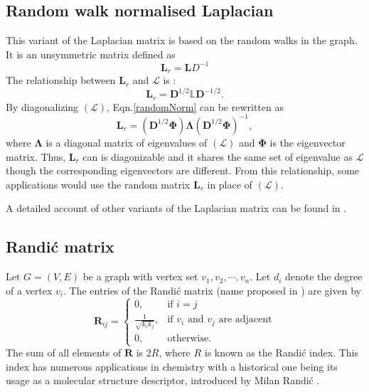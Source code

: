 \documentclass[10pt,a4paper]{article}
\theoremstyle{plain}
\theoremstyle{definition}
\begin{document}
\subsection{Random walk normalised Laplacian}
This variant of the Laplacian matrix is based on the random walks in the graph. It is an unsymmetric matrix defined as 
\begin{equation}
\mathbf{L}_r = \mathbf{L} D^{-1}
\end{equation}
The relationship between $\mathbf{L}_r$ and $\mathcal{L}$ is :
\begin{equation}
\mathbf{L}_r = \mathbf{D}^{1/2} \mathbb{L} \mathbf{D}^{-1/2}.
\label{randomNorm}
\end{equation}
By diagonalizing $\mathcal{(L)}$, Eqn.\ref{randomNorm} can be rewritten as 
\begin{equation}
\mathbf{L}_r = (\mathbf{D}^{1/2} \mathbf{\Phi}) \mathbf{\Lambda} (\mathbf{D}^{1/2} \mathbf{\Phi})^{-1},
\label{decomprandom}
\end{equation}
where $\mathbf{\Lambda}$ is a diagonal matrix of eigenvalues of $\mathcal{(L)}$ and $\mathbf{\Phi}$ is the eigenvector matrix. Thus, $\mathbf{L}_r$ can is diagonizable and it shares the same set of eigenvalue as $\mathcal{L}$ though the corresponding eigenvectors are different. From this relationship, some applications would use the random matrix $\mathbf{L}_r$ in place of $\mathcal{(L)}$.

A detailed account of other variants of the Laplacian matrix can be found in \citep{tsiatas2012diffusion}.

\subsection{Randi\'{c} matrix}
Let $G=(V,E)$ be a graph with vertex set ${v_1,v_2, \cdots, v_n}$. Let $d_i$ denote the degree of a vertex $v_i$. The entries of the Randi\'{c} matrix (name proposed in \citep{bozkurt2010randic}) are given by
\begin{equation*}
\mathbf{R}_{ij} = \begin{cases} 0, &\mbox{if } i = j \\
\frac{1}{\sqrt{k_i k_j}}, &\mbox{if } v_i \text{ and } v_j \text{ are adjacent} \\ 
0, & \text{otherwise}.
\end{cases}
\end{equation*}
The sum of all elements of $\mathbf{R}$ is $2R$, where $R$ is known as the Randi\'{c} index. This index has numerous applications in chemistry with a historical one being its usage as a molecular structure descriptor, introduced by Milan Randi\'{c} \citep{randic1975characterization}.
\end{document}
